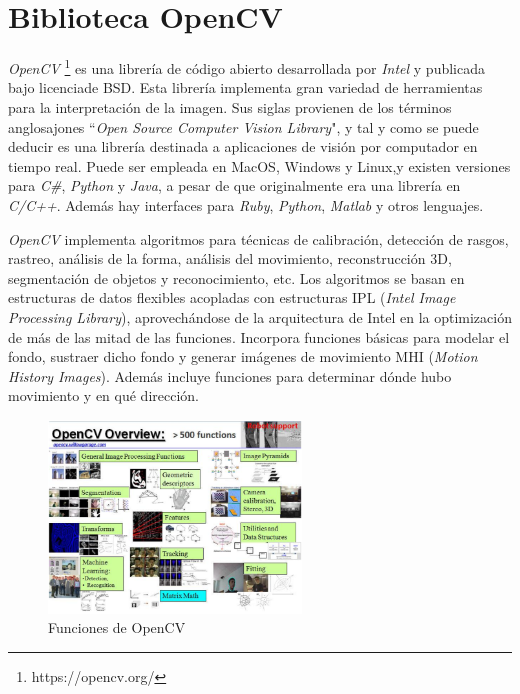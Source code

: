 \section{Biblioteca OpenCV}

\textit{OpenCV} \footnote{https://opencv.org/} es una librería de código abierto desarrollada por \textit{Intel} y publicada  bajo licenciade BSD. Esta librería implementa gran variedad de herramientas para la interpretación de la imagen. Sus  siglas  provienen  de  los  términos anglosajones ``\textit{Open Source Computer  Vision Library}", y tal y como se puede deducir es una librería destinada a aplicaciones de visión por computador en tiempo real. Puede ser empleada en MacOS, Windows y Linux,y existen versiones para \textit{C\#}, \textit{Python} y \textit{Java}, a pesar de que originalmente era una librería en \textit{C/C++}. Además hay interfaces para \textit{Ruby}, \textit{Python}, \textit{Matlab} y otros lenguajes. 

\textit{OpenCV} implementa algoritmos para técnicas de calibración, detección de rasgos, rastreo, análisis de la forma, análisis del movimiento, reconstrucción 3D, segmentación de objetos y reconocimiento, etc. Los algoritmos se basan  en  estructuras de datos flexibles acopladas con estructuras IPL (\textit{Intel  Image Processing Library}), aprovechándose de la arquitectura de Intel en la optimización de más de las mitad de las funciones. Incorpora funciones básicas para modelar el fondo, sustraer dicho  fondo y generar imágenes de movimiento MHI  (\textit{Motion  History  Images}).  Además  incluye  funciones para determinar dónde hubo movimiento y en qué dirección. 

\begin{figure}[H]
  \begin{center}
    \includegraphics[width=0.6\textwidth]{figures/Herramientas/opencv.png}
		\caption{Funciones de OpenCV}
		\label{fig.opencv}
		\end{center}
\end{figure}

